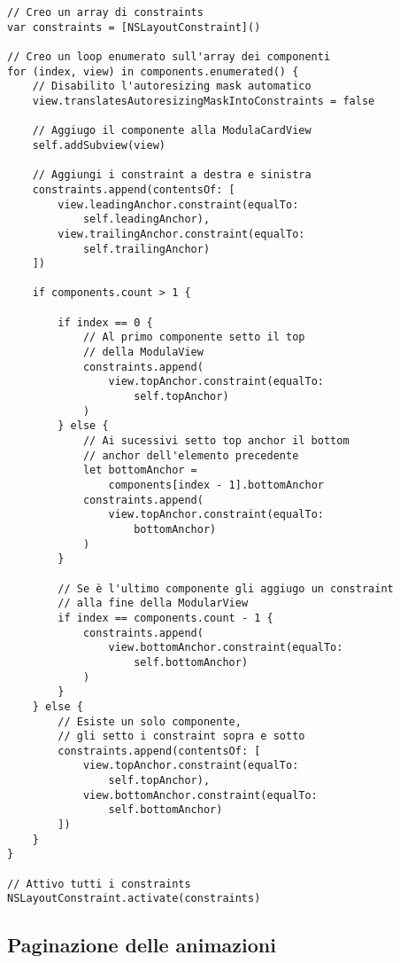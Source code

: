 \begin{verbatim}
// Creo un array di constraints
var constraints = [NSLayoutConstraint]()
    
// Creo un loop enumerato sull'array dei componenti
for (index, view) in components.enumerated() {
    // Disabilito l'autoresizing mask automatico
    view.translatesAutoresizingMaskIntoConstraints = false
    
    // Aggiugo il componente alla ModulaCardView
    self.addSubview(view)
    
    // Aggiungi i constraint a destra e sinistra
    constraints.append(contentsOf: [
        view.leadingAnchor.constraint(equalTo: 
            self.leadingAnchor),
        view.trailingAnchor.constraint(equalTo:
            self.trailingAnchor)
    ])
    
    if components.count > 1 {

        if index == 0 {
            // Al primo componente setto il top
            // della ModulaView
            constraints.append(
                view.topAnchor.constraint(equalTo:
                    self.topAnchor)
            )
        } else {
            // Ai sucessivi setto top anchor il bottom
            // anchor dell'elemento precedente
            let bottomAnchor = 
                components[index - 1].bottomAnchor
            constraints.append(
                view.topAnchor.constraint(equalTo:
                    bottomAnchor)
            )
        }
        
        // Se è l'ultimo componente gli aggiugo un constraint
        // alla fine della ModularView
        if index == components.count - 1 {
            constraints.append(
                view.bottomAnchor.constraint(equalTo:
                    self.bottomAnchor)
            )
        }
    } else {
        // Esiste un solo componente,
        // gli setto i constraint sopra e sotto
        constraints.append(contentsOf: [
            view.topAnchor.constraint(equalTo:
                self.topAnchor),
            view.bottomAnchor.constraint(equalTo:
                self.bottomAnchor)
        ])
    }
}

// Attivo tutti i constraints
NSLayoutConstraint.activate(constraints)
\end{verbatim}

\subsection{Paginazione delle animazioni}

